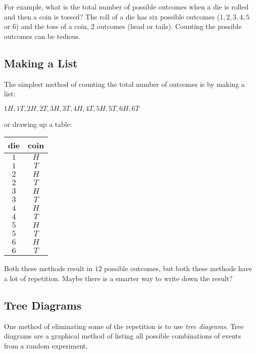 For example, what is the total number of possible outcomes when a die is rolled and then a coin is tossed? The roll of a die has six possible outcomes ($1, 2, 3, 4, 5$ or $6$) and the toss of a coin, $2$ outcomes (head or tails). Counting the possible outcomes can be tedious.

\subsection{Making a List}
The simplest method of counting the total number of outcomes is by making a list:

\begin{center}
$1H, 1T, 2H, 2T, 3H, 3T, 4H, 4T, 5H, 5T, 6H, 6T$
\end{center}

or drawing up a table:

\begin{center}
\begin{tabular}{|c|c|}\hline
die & coin\\\hline\hline
$1$&$H$\\\hline
$1$&$T$\\\hline
$2$&$H$\\\hline
$2$&$T$\\\hline
$3$&$H$\\\hline
$3$&$T$\\\hline
$4$&$H$\\\hline
$4$&$T$\\\hline
$5$&$H$\\\hline
$5$&$T$\\\hline
$6$&$H$\\\hline
$6$&$T$\\\hline
\end{tabular}
\end{center}

Both these methods result in $12$ possible outcomes, but both these methods have a lot of repetition. Maybe there is a smarter way to write down the result?

\subsection{Tree Diagrams}
One method of eliminating some of the repetition is to use \textit{tree diagrams}. Tree diagrams are a graphical method of listing all possible combinations of events from a random experiment.

